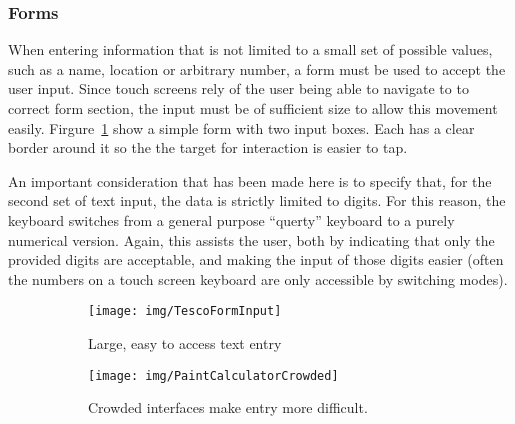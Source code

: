 
\subsubsection{Forms}
\label{ssub:forms}

When entering information that is not limited to a small set of possible
values, such as a name, location or arbitrary number, a form must be used to
accept the user input. Since touch screens rely of the user being able to
navigate to to correct form section, the input must be of sufficient size to
allow this movement easily. Firgure~\ref{fig:TescoFormInput} show a simple form
with two input boxes. Each has a clear border around it so the the target for
interaction is easier to tap.

An important consideration that has been made here is to specify that, for the
second set of text input, the data is strictly limited to digits. For this
reason, the keyboard switches from a general purpose ``querty'' keyboard to a
purely numerical version. Again, this assists the user, both by indicating that
only the provided digits are acceptable, and making the input of those digits
easier (often the numbers on a touch screen keyboard are only accessible by
switching modes).

\begin{figure}[ht]
    \centering
    \begin{subfigure}[b]{0.25\textwidth}
        \texttt{[image: img/TescoFormInput]}
        \caption{Large, easy to access text entry}\label{fig:TescoFormInput}
    \end{subfigure}%
    \qquad
    \begin{subfigure}[b]{0.3\textwidth}
        \texttt{[image: img/PaintCalculatorCrowded]}
        \caption{Crowded interfaces make entry more difficult.}
    \end{subfigure}
    \caption{}\label{fig:PaintCalculatorCrowded}
\end{figure}



